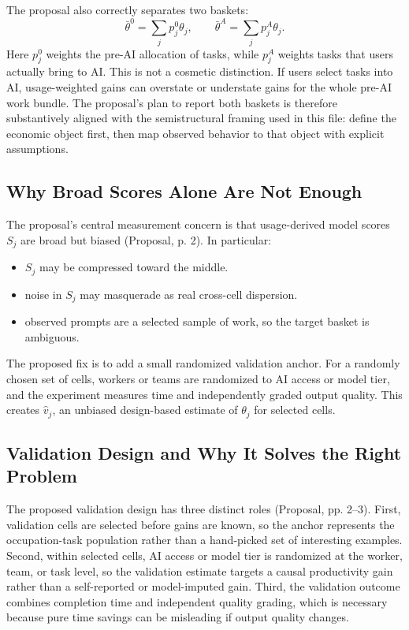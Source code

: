 \documentclass[11pt]{article}
\begin{document}
The proposal also correctly separates two baskets:
\[
  \bar\theta^0=\sum_j p_j^0\theta_j,
  \qquad
  \bar\theta^A=\sum_j p_j^A\theta_j.
\]
Here $p_j^0$ weights the pre-AI allocation of tasks, while $p_j^A$ weights tasks that users actually bring to AI. This is not a cosmetic distinction. If users select tasks into AI, usage-weighted gains can overstate or understate gains for the whole pre-AI work bundle. The proposal's plan to report both baskets is therefore substantively aligned with the semistructural framing used in this file: define the economic object first, then map observed behavior to that object with explicit assumptions.

\subsection{Why Broad Scores Alone Are Not Enough}

The proposal's central measurement concern is that usage-derived model scores $S_j$ are broad but biased (Proposal, p. 2). In particular:
\begin{itemize}[leftmargin=*]
  \item $S_j$ may be compressed toward the middle.
  \item noise in $S_j$ may masquerade as real cross-cell dispersion.
  \item observed prompts are a selected sample of work, so the target basket is ambiguous.
\end{itemize}

The proposed fix is to add a small randomized validation anchor. For a randomly chosen set of cells, workers or teams are randomized to AI access or model tier, and the experiment measures time and independently graded output quality. This creates $\widehat v_j$, an unbiased design-based estimate of $\theta_j$ for selected cells.

\subsection{Validation Design and Why It Solves the Right Problem}

The proposed validation design has three distinct roles (Proposal, pp. 2--3). First, validation cells are selected before gains are known, so the anchor represents the occupation-task population rather than a hand-picked set of interesting examples. Second, within selected cells, AI access or model tier is randomized at the worker, team, or task level, so the validation estimate targets a causal productivity gain rather than a self-reported or model-imputed gain. Third, the validation outcome combines completion time and independent quality grading, which is necessary because pure time savings can be misleading if output quality changes.
\end{document}
